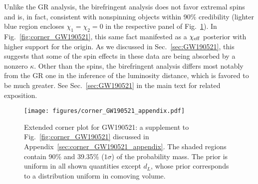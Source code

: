 \documentclass[aps,prd,twocolumn,superscriptaddress,preprintnumbers,nofootinbib]{revtex4-2}
\begin{document}
Unlike the \ac{GR} analysis, the birefringent analysis does not favor extremal spins and is, in fact, consistent with nonspinning objects within 90\% credibility (lighter blue region encloses $\chi_1 = \chi_2 = 0$ in the respective panel of Fig.~\ref{fig:corner_GW190521_appendix}).
In Fig.~\ref{fig:corner_GW190521}, this same fact manifested as a $\chi_{\rm eff}$ posterior with higher support for the origin.
As we discussed in Sec.~\ref{sec:GW190521}, this suggests that some of the spin effects in these data are being absorbed by a nonzero $\kappa$.
Other than the spins, the birefringent analysis differs most notably from the \ac{GR} one in the inference of the luminosity distance, which is favored to be much greater.
See Sec.~\ref{sec:GW190521} in the main text for related exposition.


\begin{figure*}[h]
    \texttt{[image: figures/corner\_GW190521\_appendix.pdf]}
    \caption{
        Extended corner plot for GW190521: a supplement to Fig.~\ref{fig:corner_GW190521} discussed in Appendix~\ref{sec:corner_GW190521_appendix}.
        The shaded regions contain 90\% and 39.35\% ($1\sigma$) of the probability mass.
        The prior is uniform in all shown quantities except $d_L$, whose prior corresponds to a distribution uniform in comoving volume.
    }
    \label{fig:corner_GW190521_appendix}
\end{figure*}


\end{document}
